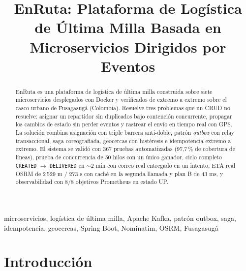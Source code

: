 \documentclass[conference]{IEEEtran}
\begin{document}
\title{EnRuta: Plataforma de Log\'istica de \'Ultima Milla Basada en Microservicios Dirigidos por Eventos}
\author{
\and
{}
}
\maketitle


\begin{abstract}
EnRuta es una plataforma de log\'istica de \'ultima milla construida sobre siete microservicios
desplegados con Docker y verificados de extremo a extremo sobre el casco urbano de Fusagasug\'a
(Colombia). Resuelve tres problemas que un CRUD no resuelve: asignar un repartidor sin duplicados
bajo contenci\'on concurrente, propagar los cambios de estado sin perder eventos y rastrear el
env\'io en tiempo real con GPS. La soluci\'on combina asignaci\'on con triple barrera anti-doble,
patr\'on \emph{outbox} con relay transaccional, saga coreografiada, geocercas con hist\'eresis e
idempotencia extremo a extremo. El sistema se valid\'o con 367 pruebas automatizadas (97,7\,\% de
cobertura de l\'ineas), prueba de concurrencia de 50 hilos con un \'unico ganador, ciclo completo
\texttt{CREATED} $\rightarrow$ \texttt{DELIVERED} en $\sim$2 min con correo real entregado en un
intento, ETA real OSRM de 2\,529 m / 273 s con cach\'e en la segunda llamada y plan B de 43 ms, y
observabilidad con 8/8 objetivos Prometheus en estado UP.
\end{abstract}

\begin{IEEEkeywords}
microservicios, log\'istica de \'ultima milla, Apache Kafka, patr\'on outbox, saga, idempotencia,
geocercas, Spring Boot, Nominatim, OSRM, Fusagasug\'a
\end{IEEEkeywords}

\section{Introducción}
\end{document}
